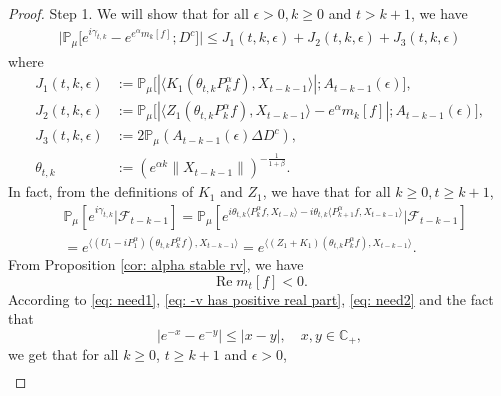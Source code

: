 \documentclass[12pt,a4paper]{amsart}
\theoremstyle{plain}
\theoremstyle{definition}
\numberwithin{equation}{section}
\begin{document}
\begin{proof}
    Step 1. We will show that for all $\epsilon > 0, k\geq 0$ and $t>k+1$, we have
\begin{equation}\begin{split}
    \big|\mathbb{P}_{\mu}\big[e^{i\gamma_{t,k}}-e^{e^{\alpha}m_k[f]}; D^c\big]\big|
    \leq J_1(t,k,\epsilon)+J_2(t,k,\epsilon)+J_3(t,k,\epsilon)
\end{split}\end{equation}
    where
\begin{equation}\begin{split}
\label{eq: Def of Ji}
    J_1(t,k,\epsilon)
    &:= \mathbb{P}_{\mu}\big[|\langle K_1(\theta_{t,k}P^\alpha_k f), X_{t-k-1}\rangle|; A_{t-k-1}(\epsilon) \big],
    \\ J_2(t,k,\epsilon)
    &:= \mathbb{P}_{\mu}\big[|\langle Z_1(\theta_{t,k}P^\alpha_k f),X_{t-k-1}\rangle-e^{\alpha}m_k[f]|; A_{t-k-1}(\epsilon)\big],
    \\ J_3(t,k, \epsilon)
    &:=2\mathbb{P}_{\mu}(A_{t-k-1}(\epsilon)\Delta D^c),
    \\\theta_{t,k}
    &:= (e^{\alpha k}\|X_{t-k-1}\|)^{-\frac{1}{1+\beta}}.
\end{split}\end{equation}
In fact, from the definitions of $K_1$ and $Z_1$, we have that for all
$k\geq 0, t\geq k+1$,
\begin{equation}\begin{split}
\label{eq: need1}
    &\mathbb{P}_{\mu}[e^{i\gamma_{t,k}}|\mathscr{F}_{t-k-1}]
    =\mathbb{P}_{\mu}[e^{i\theta_{t,k}\langle P^\alpha_k f,X_{t-k}\rangle-i\theta_{t,k}\langle P^\alpha_{k+1} f, X_{t-k-1}\rangle}|\mathscr{F}_{t-k-1}]
    \\&=e^{\langle (U_1 - iP^\alpha_1 ) (\theta_{t,k}P^\alpha_k f),X_{t-k-1}\rangle}
    =e^{\langle (Z_1 + K_1) (\theta_{t,k}P^\alpha_k f),X_{t-k-1}\rangle}.
\end{split}\end{equation}
       From Proposition \ref{cor: alpha stable rv}, we have
\begin{equation}
\label{eq: need2}
    \operatorname {Re} m_t[f] < 0.
\end{equation}
    According to \eqref{eq: need1}, \eqref{eq: -v has positive real part}, \eqref{eq: need2} and the fact that
\[
    |e^{-x} - e^{-y}| \leq |x-y|,\quad x,y \in \mathbb C_+,
\]
    we get that for all $k\geq 0$, $t\geq k+1$ and $\epsilon> 0$,
\begin{equation}\begin{split}
\label{eq: inequality that will used later}

\end{split}
\end{equation}
\end{proof}
\end{document}
